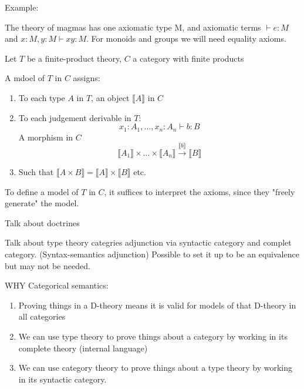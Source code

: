 Example:

The theory of magmas has one axiomatic type M, and axiomatic terms $\vdash e : M$ and $x : M, y : M \vdash xy : M$. For monoids and groups we will need equality axioms.

Let $T$ be a finite-product theory, $C$ a category with finite products

A mdoel of $T$ in $C$ assigns:

\begin{enumerate}
\item To each type $A$ in $T$, an object $\llbracket A \rrbracket$ in $C$
\item To each judgement derivable in $T$:
    $$x_1 : A_1, \dots, x_n : A_n \vdash b : B$$
    A morphism in $C$
    $$\llbracket A_1 \rrbracket \times \dots \times \llbracket A_n \rrbracket \xrightarrow{\llbracket b \rrbracket} \llbracket B \rrbracket$$
\item Such that $\llbracket A \times B \rrbracket = \llbracket A \rrbracket \times \llbracket B \rrbracket$ etc.
\end{enumerate}

To define a model of $T$ in $C$, it suffices to interpret the axioms, since they "freely generate" the model.


Talk about doctrines

Talk about type theory categries adjunction via syntactic category and complet category. (Syntax-semantics adjunction) Possible to set it up to be an equivalence but may not be needed.

WHY Categorical semantics:
\begin{enumerate}
 \item Proving things in a D-theory means it is valid for models of that D-theory in all categories
 \item We can use type theory to prove things about a category by working in its complete theory (internal language)
 \item We can use category theory to prove things about a type theory by working in its syntactic category.
\end{enumerate}






